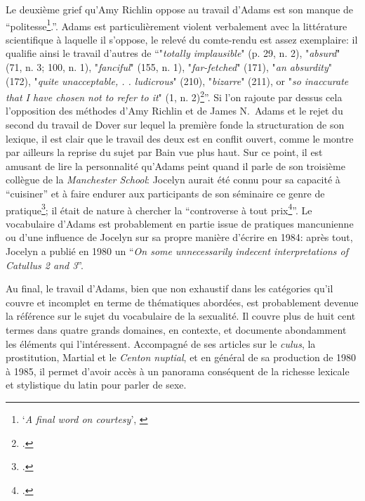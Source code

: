Le deuxième grief qu'Amy Richlin oppose au travail d'Adams est son manque de \enquote{politesse\footnote{\enquote{\textit{A final word on courtesy}}, \textcite[p.~494]{richlin1984latin}}.}. Adams est particulièrement violent verbalement avec la littérature scientifique à laquelle il s'oppose, le relevé du comte-rendu est assez exemplaire: il qualifie ainsi le travail d'autres de \enquote{"\textit{totally implausible}" (p. 29, n. 2), "\textit{absurd}" (71, n. 3; 100, n. 1), "\textit{fanciful}" (155, n. 1), "\textit{far-fetched}" (171), "\textit{an absurdity}" (172), "\textit{quite unacceptable, . . ludicrous}" (210), "\textit{bizarre}" (211), or "\textit{so inaccurate that I have chosen not to refer to it}" (1, n. 2)\footcite[p.~494]{richlin_sexual_1978}}. Si l'on rajoute par dessus cela l'opposition des méthodes d'Amy Richlin et de James N.~Adams et le rejet du second du travail de Dover sur lequel la première fonde la structuration de son lexique, il est clair que le travail des deux est en conflit ouvert, comme le montre par ailleurs la reprise du sujet par Bain vue plus haut. Sur ce point, il est amusant de lire la personnalité qu'Adams peint quand il parle de son troisième collègue de la \textit{Manchester School}: Jocelyn aurait été connu pour sa capacité à \enquote{cuisiner} et à faire endurer aux participants de son séminaire ce genre de pratique\footcite[p.291]{adams_henry_2003}; il était de nature à chercher la \enquote{controverse à tout prix\footcite[p.290]{adams_henry_2003}}. Le vocabulaire d'Adams est probablement en partie issue de pratiques mancunienne ou d'une influence de Jocelyn sur sa propre manière d'écrire en 1984: après tout, Jocelyn a publié en 1980 un \enquote{\textit{On some unnecessarily indecent interpretations of Catullus 2 and 3}}.

Au final, le travail d'Adams, bien que non exhaustif dans les catégories qu'il couvre et incomplet en terme de thématiques abordées, est probablement devenue la référence sur le sujet du vocabulaire de la sexualité. Il couvre plus de huit cent termes dans quatre grands domaines, en contexte, et documente abondamment les éléments qui l'intéressent. Accompagné de ses articles sur le \textit{culus}, la prostitution, Martial et le \textit{Centon nuptial}, et en général de sa production de 1980 à 1985, il permet d'avoir accès à un panorama conséquent de la richesse lexicale et stylistique du latin pour parler de sexe.



